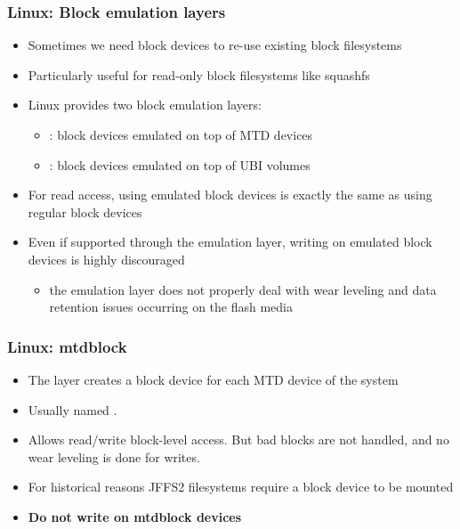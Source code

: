 \begin{frame}
  \frametitle{Linux: Block emulation layers}
  \begin{itemize}
  \item Sometimes we need block devices to re-use existing block
    filesystems
  \item Particularly useful for read-only block filesystems like squashfs
  \item Linux provides two block emulation layers:
    \begin{itemize}
    \item {}: block devices emulated on top of MTD devices
    \item {}: block devices emulated on top of UBI volumes
    \end{itemize}
  \item For read access, using emulated block devices is exactly the same
    as using regular block devices
  \item Even if supported through the  emulation layer,
    writing on emulated block devices is highly discouraged
    \begin{itemize}
    \item the emulation layer does not properly deal with wear
      leveling and data retention issues occurring on the flash media
    \end{itemize}
  \end{itemize}
\end{frame}

\begin{frame}
  \frametitle{Linux: mtdblock}
  \begin{itemize}
  \item The  layer creates a block device for each MTD
    device of the system
  \item Usually named .
  \item Allows read/write block-level access. But bad blocks are not
    handled, and no wear leveling is done for writes.
  \item For historical reasons JFFS2 filesystems require a block device
    to be mounted
  \item {\bf Do not write on mtdblock devices}
  \end{itemize}
\end{frame}

